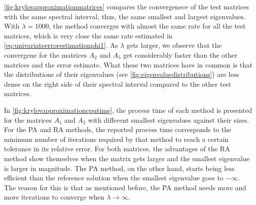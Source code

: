 \autoref{fig:krylovapproximationmatrices} compares the convergenece of the
test matrices with the same spectral interval, thus, the same smallest and largest
eigenvalues.
With $\lambda = 1000$, the method converges with almost the same rate for all
the test matrices, which is very close the same rate estimated in
\eqref{eq:univariateerrorestimationphi1}.
As $\lambda$ gets larger, we observe that the convergene for the matrices
$A_2$ and $A_5$ get considerably faster than the other matrices and the error estimate.
What these two matrices have in common is that the distributions of their eigenvalues
(see \autoref{fig:eigenvaluedistributions}) are less dense on the right side of their
spectral interval compared to the other test matrices.

In \autoref{fig:krylovapproximationcputime}, the process time of each method is presented for
the matrices $A_1$ and $A_2$ with different smallest eigenvalues against their sizes. For
the PA and RA methods, the reported process time corresponds to the minimum number of
iterations required by that method to reach a certain tolerance in its relative error.
For both matrices, the advantages of the RA method show themselves when the matrix gets
larger and the smallest eigenvalue is larger in magnitude. The PA method, on the other hand,
starts being less efficient than the reference solution when the smallest eigenvalue goes
to $-\infty$. The reason for this is that as mentioned before, the PA method needs more
and more iterations to converge when $\lambda \to \infty$.

